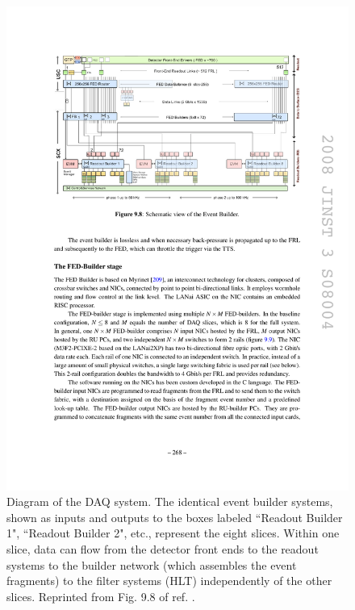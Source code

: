 \documentclass[dissertation.tex]{subfiles}
\begin{document}
\begin{figure}
	\centering
	\includegraphics[scale=1.0]{DAQ_overview}
	\caption{Diagram of the DAQ system.  The identical event builder systems, shown as inputs and outputs to the boxes labeled ``Readout Builder 1", ``Readout Builder 2", etc., represent the eight slices.  Within one slice, data can flow from the detector front ends to the readout systems to the builder network (which assembles the event fragments) to the filter systems (HLT) independently of the other slices.  Reprinted from Fig. 9.8 of ref. \cite{1748-0221-3-08-S08004}.}
	\label{fig:DAQ_overview}
\end{figure}
\end{document}
